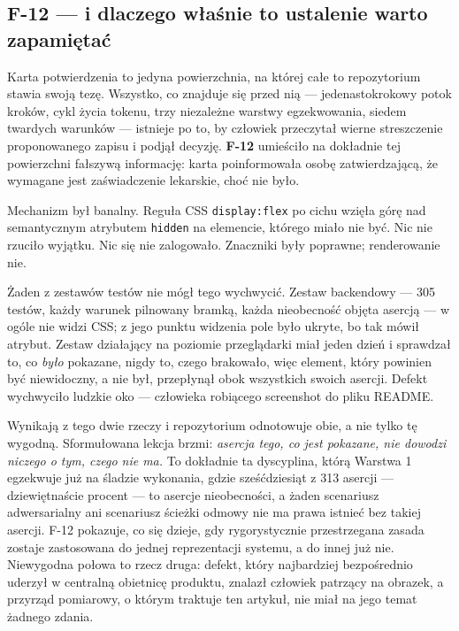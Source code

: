 \documentclass[11pt,a4paper]{article}
\newcommand{\finding}[1]{{\color{primaryblue}\textbf{#1}}}
\begin{document}
\subsection{F-12 --- i dlaczego właśnie to ustalenie warto zapamiętać}

Karta potwierdzenia to jedyna powierzchnia, na której całe to repozytorium stawia
swoją tezę. Wszystko, co znajduje się przed nią --- jedenastokrokowy potok
kroków, cykl życia tokenu, trzy niezależne warstwy egzekwowania, siedem twardych
warunków --- istnieje po to, by człowiek przeczytał wierne streszczenie
proponowanego zapisu i podjął decyzję. \finding{F-12} umieściło na dokładnie tej
powierzchni fałszywą informację: karta poinformowała osobę zatwierdzającą, że
wymagane jest zaświadczenie lekarskie, choć nie było.

Mechanizm był banalny. Reguła CSS \texttt{display:flex} po cichu wzięła górę nad
semantycznym atrybutem \texttt{hidden} na elemencie, którego miało nie być. Nic
nie rzuciło wyjątku. Nic się nie zalogowało. Znaczniki były poprawne;
renderowanie nie.

Żaden z zestawów testów nie mógł tego wychwycić. Zestaw backendowy --- 305
testów, każdy warunek pilnowany bramką, każda nieobecność objęta asercją --- w
ogóle nie widzi CSS; z jego punktu widzenia pole było ukryte, bo tak mówił
atrybut. Zestaw działający na poziomie przeglądarki miał jeden dzień i sprawdzał
to, co \emph{było} pokazane, nigdy to, czego brakowało, więc element, który
powinien być niewidoczny, a nie był, przepłynął obok wszystkich swoich asercji.
Defekt wychwyciło ludzkie oko --- człowieka robiącego screenshot do pliku
README.

Wynikają z tego dwie rzeczy i repozytorium odnotowuje obie, a nie tylko tę
wygodną. Sformułowana lekcja brzmi: \emph{asercja tego, co jest pokazane, nie
dowodzi niczego o tym, czego nie ma.} To dokładnie ta dyscyplina, którą Warstwa 1
egzekwuje już na śladzie wykonania, gdzie sześćdziesiąt z 313 asercji ---
dziewiętnaście procent --- to asercje nieobecności, a żaden scenariusz
adwersarialny ani scenariusz ścieżki odmowy nie ma prawa istnieć bez takiej
asercji. F-12 pokazuje, co się dzieje, gdy rygorystycznie przestrzegana zasada
zostaje zastosowana do jednej reprezentacji systemu, a do innej już nie.
Niewygodna połowa to rzecz druga: defekt, który najbardziej bezpośrednio uderzył
w centralną obietnicę produktu, znalazł człowiek patrzący na obrazek, a przyrząd
pomiarowy, o którym traktuje ten artykuł, nie miał na jego temat żadnego zdania.
\end{document}
